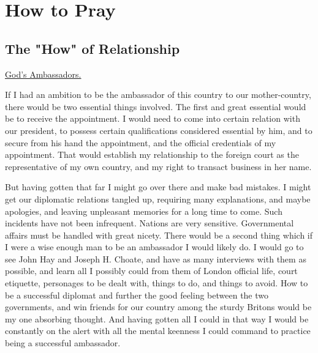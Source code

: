 \part{How to Pray}





\chapter{The "How" of Relationship}



\underline{God's Ambassadors.}


If I had an ambition to be the ambassador of this country to our
mother-country, there would be two essential things involved. The first
and great essential would be to receive the appointment. I would need to
come into certain relation with our president, to possess certain
qualifications considered essential by him, and to secure from his hand
the appointment, and the official credentials of my appointment. That
would establish my relationship to the foreign court as the representative
of my own country, and my right to transact business in her name.

But having gotten that far I might go over there and make bad mistakes. I
might get our diplomatic relations tangled up, requiring many
explanations, and maybe apologies, and leaving unpleasant memories for a
long time to come. Such incidents have not been infrequent. Nations are
very sensitive. Governmental affairs must be handled with great nicety.
There would be a second thing which if I were a wise enough man to be an
ambassador I would likely do. I would go to see John Hay and Joseph H.
Choate, and have as many interviews with them as possible, and learn all I
possibly could from them of London official life, court etiquette,
personages to be dealt with, things to do, and things to avoid. How to be
a successful diplomat and further the good feeling between the two
governments, and win friends for our country among the sturdy Britons
would be my one absorbing thought. And having gotten all I could in that
way I would be constantly on the alert with all the mental keenness I
could command to practice being a successful ambassador.

